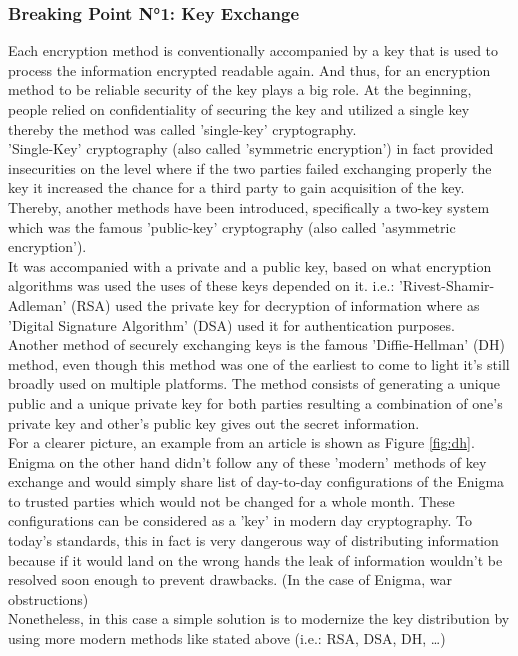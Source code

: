 \documentclass[conference,compsoc]{IEEEtran}
\begin{document}
\subsubsection{Breaking Point N°1: Key Exchange} Each encryption method is conventionally accompanied by a key that is used to process the information encrypted readable again. And thus, for an encryption method to be reliable security of the key plays a big role. At the beginning, people relied on confidentiality of securing the key and utilized a single key thereby the method was called 'single-key' cryptography.\\
'Single-Key' cryptography (also called 'symmetric encryption') in fact provided insecurities on the level where if the two parties failed exchanging properly the key it increased the chance for a third party to gain acquisition of the key.\\
Thereby, another methods have been introduced, specifically a two-key system which was the famous 'public-key' cryptography (also called 'asymmetric encryption').\\
It was accompanied with a private and a public key, based on what encryption algorithms was used the uses of these keys depended on it. i.e.: 'Rivest-Shamir-Adleman' (RSA) used the private key for decryption of information where as 'Digital Signature Algorithm' (DSA) used it for authentication purposes.\\
Another method of securely exchanging keys is the famous 'Diffie-Hellman' (DH) method, even though this method was one of the earliest to come to light it's still broadly used on multiple platforms. The method consists of generating a unique public and a unique private key for both parties resulting a combination of one's private key and other's public key gives out the secret information.\\
For a clearer picture, an example from an article is shown as Figure \ref{fig:dh}.\\
Enigma on the other hand didn't follow any of these 'modern' methods of key exchange and would simply share list of day-to-day configurations of the Enigma to trusted parties which would not be changed for a whole month. These configurations can be considered as a 'key' in modern day cryptography.
To today's standards, this in fact is very dangerous way of distributing information because if it would land on the wrong hands the leak of information wouldn't be resolved soon enough to prevent drawbacks. (In the case of Enigma, war obstructions)\\ 
Nonetheless, in this case a simple solution is to modernize the key distribution by using more modern methods like stated above (i.e.:  RSA, DSA, DH, \ldots)
\end{document}
